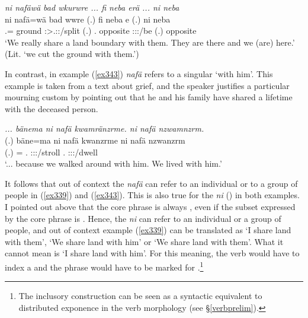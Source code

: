 \begin{exe}
	\ex \emph{ni nafäwä bad wkurwre ... fi neba erä ... ni neba}\\
	\gll ni nafä=wä bad wwre (.) fi neba e (.) ni neba\\
	\Fnsg{} \Third\Pl.\Assoc=\Emph{} ground \Fpl:\Sbj>\Tsg.\F:\Nonpast:\Ipfv/split (.) \Third.\Abs{} opposite \Stpl:\Sbj:\Nonpast:\Ipfv/be (.) \First{} opposite\\
	\trans `We really share a land boundary with them. They are there and we (are) here.' (Lit. `we cut the ground with them.')
	\label{ex339}
\end{exe}

In contrast, in example (\ref{ex343}) \emph{nafä} refers to a singular `with him'. This example is taken from a text about grief, and the speaker justifies a particular mourning custom by pointing out that he and his family have shared a lifetime with the deceased person.

\begin{exe}
	\ex \emph{... bänema ni nafä kwamränzrme. ni nafä nzwamnzrm.}\\
	\gll (.) bäne=ma ni nafä kwanzrme ni nafä nzwanzrm\\
	(.) \Recog=\Char{} \Fnsg{} \Third\Pl.\Assoc{} \Fpl:\Sbj:\Pst:\Dur/stroll \Fnsg{} \Third\Pl.\Assoc{} \Fpl:\Sbj:\Pst:\Dur/dwell\\
	\trans `... because we walked around with him. We lived with him.'
	\label{ex343}
\end{exe}

It follows that out of context the  \emph{nafä} can refer to an individual or to a group of people in (\ref{ex339}) and (\ref{ex343}). This is also true for the  \emph{ni} (\Fnsg) in both examples. I pointed out above that the core phrase is always , even if the subset expressed by the core phrase is . Hence, the  \emph{ni} can refer to an individual or a group of people, and out of context example (\ref{ex339}) can be translated as `I share land with them', `We share land with him' or `We share land with them'. What it cannot mean is `I share land with him'. For this meaning, the verb would have to index a  and the  phrase would have to be marked for  .\footnote{The inclusory construction can be seen as a syntactic equivalent to distributed exponence in the verb morphology (see \S{}\ref{verbprelim}).}%

